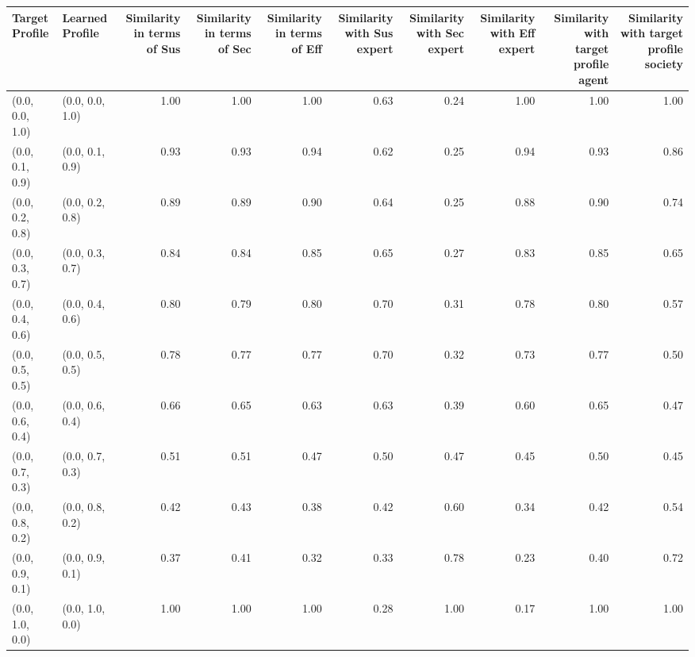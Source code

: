 \begin{tabular}{llrrrrrrrr}
\toprule
Target Profile & Learned Profile & Similarity in terms of Sus & Similarity in terms of Sec & Similarity in terms of Eff & Similarity with Sus expert & Similarity with Sec expert & Similarity with Eff expert & Similarity with target profile agent & Similarity with target profile society \\
\midrule
(0.0, 0.0, 1.0) & (0.0, 0.0, 1.0) & 1.00 & 1.00 & 1.00 & 0.63 & 0.24 & 1.00 & 1.00 & 1.00 \\
(0.0, 0.1, 0.9) & (0.0, 0.1, 0.9) & 0.93 & 0.93 & 0.94 & 0.62 & 0.25 & 0.94 & 0.93 & 0.86 \\
(0.0, 0.2, 0.8) & (0.0, 0.2, 0.8) & 0.89 & 0.89 & 0.90 & 0.64 & 0.25 & 0.88 & 0.90 & 0.74 \\
(0.0, 0.3, 0.7) & (0.0, 0.3, 0.7) & 0.84 & 0.84 & 0.85 & 0.65 & 0.27 & 0.83 & 0.85 & 0.65 \\
(0.0, 0.4, 0.6) & (0.0, 0.4, 0.6) & 0.80 & 0.79 & 0.80 & 0.70 & 0.31 & 0.78 & 0.80 & 0.57 \\
(0.0, 0.5, 0.5) & (0.0, 0.5, 0.5) & 0.78 & 0.77 & 0.77 & 0.70 & 0.32 & 0.73 & 0.77 & 0.50 \\
(0.0, 0.6, 0.4) & (0.0, 0.6, 0.4) & 0.66 & 0.65 & 0.63 & 0.63 & 0.39 & 0.60 & 0.65 & 0.47 \\
(0.0, 0.7, 0.3) & (0.0, 0.7, 0.3) & 0.51 & 0.51 & 0.47 & 0.50 & 0.47 & 0.45 & 0.50 & 0.45 \\
(0.0, 0.8, 0.2) & (0.0, 0.8, 0.2) & 0.42 & 0.43 & 0.38 & 0.42 & 0.60 & 0.34 & 0.42 & 0.54 \\
(0.0, 0.9, 0.1) & (0.0, 0.9, 0.1) & 0.37 & 0.41 & 0.32 & 0.33 & 0.78 & 0.23 & 0.40 & 0.72 \\
(0.0, 1.0, 0.0) & (0.0, 1.0, 0.0) & 1.00 & 1.00 & 1.00 & 0.28 & 1.00 & 0.17 & 1.00 & 1.00 \\
\bottomrule
\end{tabular}

